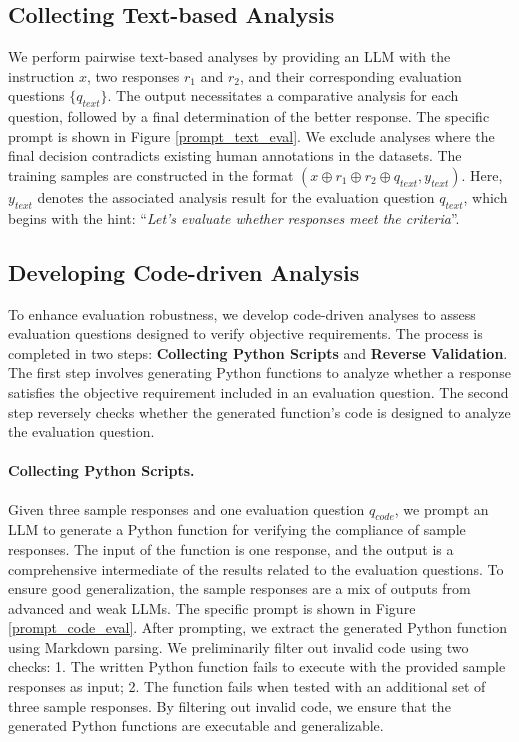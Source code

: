 \subsection{Collecting Text-based Analysis}\label{subsec:text}
We perform pairwise text-based analyses by providing an LLM with the instruction $x$, two responses $r_1$ and $r_2$, and their corresponding evaluation questions $\{ q_{text} \}$. The output necessitates a comparative analysis for each question, followed by a final determination of the better response. The specific prompt is shown in Figure \ref{prompt_text_eval}. We exclude analyses where the final decision contradicts existing human annotations in the datasets. The training samples are constructed in the format $(x \oplus r_1 \oplus r_2 \oplus q_{text}, y_{text})$. Here, $y_{text}$ denotes the associated analysis result for the evaluation question $q_{text}$, which begins with the hint: ``\textit{Let's evaluate whether responses meet the criteria}''.

\subsection{Developing Code-driven Analysis}\label{subsec:code}
To enhance evaluation robustness, we develop code-driven analyses to assess evaluation questions designed to verify objective requirements. The process is completed in two steps: \textbf{Collecting Python Scripts} and \textbf{Reverse Validation}. The first step involves generating Python functions to analyze whether a response satisfies the objective requirement included in an evaluation question. The second step reversely checks whether the generated function's code is designed to analyze the evaluation question. 

\paragraph{Collecting Python Scripts.}
Given three sample responses and one evaluation question $q_{code}$, we prompt an LLM to generate a Python function for verifying the compliance of sample responses. The input of the function is one response, and the output is a comprehensive intermediate of the results related to the evaluation questions. 
To ensure good generalization, the sample responses are a mix of outputs from advanced and weak LLMs. The specific prompt is shown in Figure \ref{prompt_code_eval}. After prompting, we extract the generated Python function using Markdown parsing. We preliminarily filter out invalid code using two checks: 1. The written Python function fails to execute with the provided sample responses as input; 2. The function fails when tested with an additional set of three sample responses. By filtering out invalid code, we ensure that the generated Python functions are executable and generalizable. 

